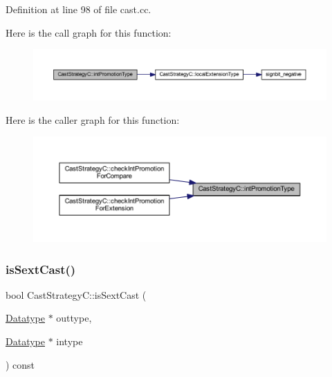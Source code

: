 Definition at line 98 of file cast.\+cc.

Here is the call graph for this function\+:
\nopagebreak
\begin{figure}[H]
\begin{center}
\leavevmode
\includegraphics[width=350pt]{class_cast_strategy_c_a628af1b296211f1cc9add47af576ea2b_cgraph}
\end{center}
\end{figure}
Here is the caller graph for this function\+:
\nopagebreak
\begin{figure}[H]
\begin{center}
\leavevmode
\includegraphics[width=350pt]{class_cast_strategy_c_a628af1b296211f1cc9add47af576ea2b_icgraph}
\end{center}
\end{figure}
\mbox{\label{class_cast_strategy_c_a626fa032a6c9ff7ab710f8d28586c72e}} 
\subsubsection{\texorpdfstring{isSextCast()}{isSextCast()}}
{\footnotesize\ttfamily bool Cast\+Strategy\+C\+::is\+Sext\+Cast (\begin{DoxyParamCaption}\item[{\mbox{\hyperlink{class_datatype}{Datatype}} $\ast$}]{outtype,  }\item[{\mbox{\hyperlink{class_datatype}{Datatype}} $\ast$}]{intype }\end{DoxyParamCaption}) const\hspace{0.3cm}{\ttfamily [virtual]}}



